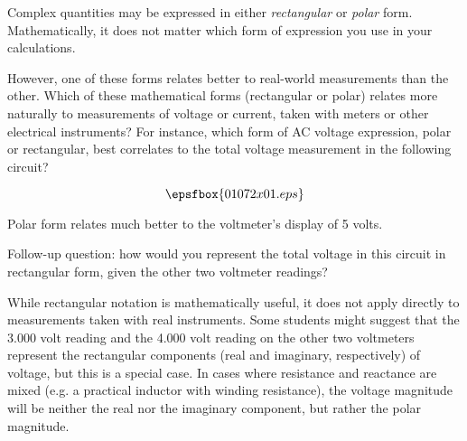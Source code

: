 

Complex quantities may be expressed in either {\it rectangular} or {\it polar} form.  Mathematically, it does not matter which form of expression you use in your calculations.

However, one of these forms relates better to real-world measurements than the other.  Which of these mathematical forms (rectangular or polar) relates more naturally to measurements of voltage or current, taken with meters or other electrical instruments?  For instance, which form of AC voltage expression, polar or rectangular, best correlates to the total voltage measurement in the following circuit?

$$\epsfbox{01072x01.eps}$$







Polar form relates much better to the voltmeter's display of 5 volts.

\vskip 10pt

Follow-up question: how would you represent the total voltage in this circuit in rectangular form, given the other two voltmeter readings?







While rectangular notation is mathematically useful, it does not apply directly to measurements taken with real instruments.  Some students might suggest that the 3.000 volt reading and the 4.000 volt reading on the other two voltmeters represent the rectangular components (real and imaginary, respectively) of voltage, but this is a special case.  In cases where resistance and reactance are mixed (e.g. a practical inductor with winding resistance), the voltage magnitude will be neither the real nor the imaginary component, but rather the polar magnitude.




